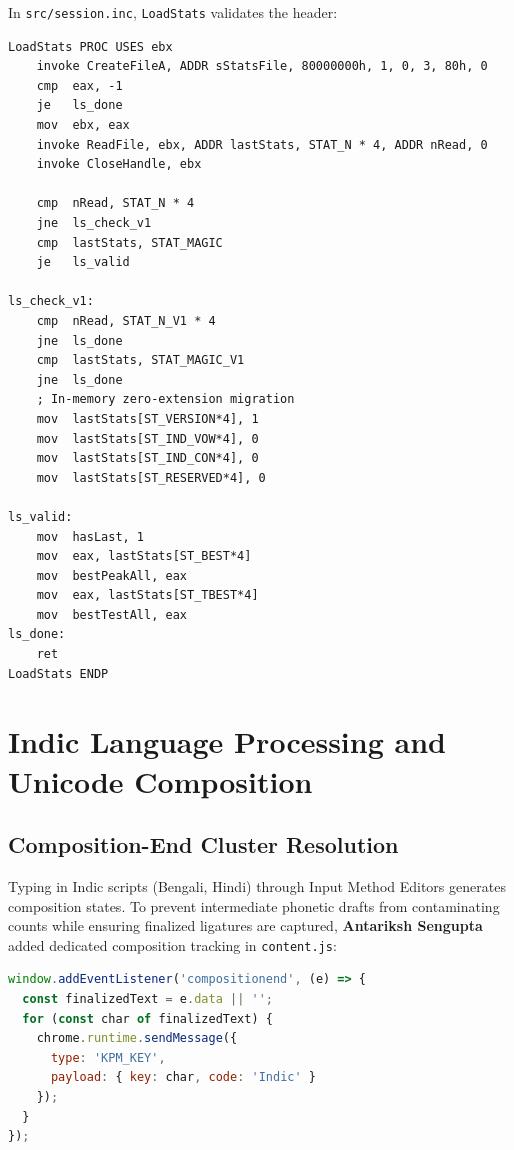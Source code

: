 \documentclass[11pt,a4paper]{article}
\begin{document}
In \texttt{src/session.inc}, \texttt{LoadStats} validates the header:
\begin{lstlisting}[language={[x86masm]Assembler}]
LoadStats PROC USES ebx
    invoke CreateFileA, ADDR sStatsFile, 80000000h, 1, 0, 3, 80h, 0
    cmp  eax, -1
    je   ls_done
    mov  ebx, eax
    invoke ReadFile, ebx, ADDR lastStats, STAT_N * 4, ADDR nRead, 0
    invoke CloseHandle, ebx

    cmp  nRead, STAT_N * 4
    jne  ls_check_v1
    cmp  lastStats, STAT_MAGIC
    je   ls_valid

ls_check_v1:
    cmp  nRead, STAT_N_V1 * 4
    jne  ls_done
    cmp  lastStats, STAT_MAGIC_V1
    jne  ls_done
    ; In-memory zero-extension migration
    mov  lastStats[ST_VERSION*4], 1
    mov  lastStats[ST_IND_VOW*4], 0
    mov  lastStats[ST_IND_CON*4], 0
    mov  lastStats[ST_RESERVED*4], 0

ls_valid:
    mov  hasLast, 1
    mov  eax, lastStats[ST_BEST*4]
    mov  bestPeakAll, eax
    mov  eax, lastStats[ST_TBEST*4]
    mov  bestTestAll, eax
ls_done:
    ret
LoadStats ENDP
\end{lstlisting}

\section{Indic Language Processing and Unicode Composition}

\subsection{Composition-End Cluster Resolution}
Typing in Indic scripts (Bengali, Hindi) through Input Method Editors generates composition states. To prevent intermediate phonetic drafts from contaminating counts while ensuring finalized ligatures are captured, \textbf{Antariksh Sengupta} added dedicated composition tracking in \texttt{content.js}:
\begin{lstlisting}[language=JavaScript]
window.addEventListener('compositionend', (e) => {
  const finalizedText = e.data || '';
  for (const char of finalizedText) {
    chrome.runtime.sendMessage({
      type: 'KPM_KEY',
      payload: { key: char, code: 'Indic' }
    });
  }
});
\end{lstlisting}
\end{document}
